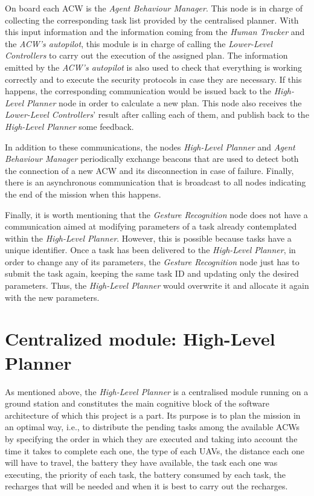 On board each \gls{ACW} is the \emph{Agent Behaviour Manager}. This node is in charge of collecting the corresponding task list provided by the centralised planner. With this input information and the information coming from the \emph{Human Tracker} and the \emph{\gls{ACW}'s autopilot}, this module is in charge of calling the \emph{Lower-Level Controllers} to carry out the execution of the assigned plan. The information emitted by the \emph{\gls{ACW}'s autopilot} is also used to check that everything is working correctly and to execute the security protocols in case they are necessary. If this happens, the corresponding communication would be issued back to the \emph{High-Level Planner} node in order to calculate a new plan. This node also receives the \emph{Lower-Level Controllers}' result after calling each of them, and publish back to the \emph{High-Level Planner} some feedback.

In addition to these communications, the nodes \emph{High-Level Planner} and \emph{Agent Behaviour Manager} periodically exchange beacons that are used to detect both the connection of a new \gls{ACW} and its disconnection in case of failure. Finally, there is an asynchronous communication that is broadcast to all nodes indicating the end of the mission when this happens.

Finally, it is worth mentioning that the \emph{Gesture Recognition} node does not have a communication aimed at modifying parameters of a task already contemplated within the \emph{High-Level Planner}. However, this is possible because tasks have a unique identifier. Once a task has been delivered to the \emph{High-Level Planner}, in order to change any of its parameters, the \emph{Gesture Recognition} node just has to submit the task again, keeping the same task \gls{ID} and updating only the desired parameters. Thus, the \emph{High-Level Planner} would overwrite it and allocate it again with the new parameters.

\section{Centralized module: High-Level Planner}
\label{sec:Centralized module:TaskPlanner}

As mentioned above, the \emph{High-Level Planner} is a centralised module running on a ground station and constitutes the main cognitive block of the software architecture of which this project is a part. Its purpose is to plan the mission in an optimal way, i.e., to distribute the pending tasks among the available \glspl{ACW} by specifying the order in which they are executed and taking into account the time it takes to complete each one, the type of each \glspl{UAV}, the distance each one will have to travel, the battery they have available, the task each one was executing, the priority of each task, the battery consumed by each task, the recharges that will be needed and when it is best to carry out the recharges.

